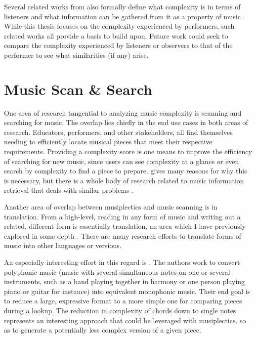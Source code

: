 \documentclass[12pt]{report}
\begin{document}
Several related works from \cite{streich2006automatic} also formally define what complexity is in terms of listeners and what information can be gathered from it as a property of music \cite{edmonds1995complexity} \cite{pressing1999cognitive} \cite{scheirer2000perceived}. While this thesis focuses on the complexity experienced by performers, such related works all provide a basis to build upon. Future work could seek to compare the complexity experienced by listeners or observers to that of the performer to see what similarities (if any) arise.

\section{Music Scan \& Search}
\label{sec:relscan}

One area of research tangential to analyzing music complexity is scanning and searching for music. The overlap lies chiefly in the end use cases in both areas of research. Educators, performers, and other stakeholders, all find themselves needing to efficiently locate musical pieces that meet their respective requirements. Providing a complexity score is one means to improve the efficiency of searching for new music, since users can see complexity at a glance or even search by complexity to find a piece to prepare. \cite{Byrd2001} gives many reasons for why this is necessary, but there is a whole body of research related to music information retrieval that deals with similar problems \cite{downie2003music} \cite{casey2008content}.

Another area of overlap between musiplectics and music scanning is in translation. From a high-level, reading in any form of music and writing out a related, different form is essentially translation, an area which I have previously explored in some depth \cite{holder2013cloudASE} \cite{holder2013cloudSPLASH} \cite{holder2014native}. There are many research efforts to translate forms of music into other languages or versions.

An especially interesting effort in this regard is \cite{Allali2009}. The authors work to convert polyphonic music (music with several simultaneous notes on one or several instruments, such as a band playing together in harmony or one person playing piano or guitar for instance) into equivalent monophonic music. Their end goal is to reduce a large, expressive format to a more simple one for comparing pieces during a lookup. The reduction in complexity of chords down to single notes represents an interesting approach that could be leveraged with musiplectics, so as to generate a potentially less complex version of a given piece.
\end{document}
